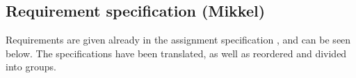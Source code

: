\subsection{Requirement specification (Mikkel)}




Requirements are given already in the assignment specification \cite{case_slides}, and can be seen below. The specifications have been translated, as well as reordered and divided into groups.\\

